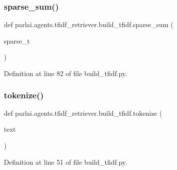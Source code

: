 \subsubsection{\texorpdfstring{sparse\+\_\+sum()}{sparse\_sum()}}
{\footnotesize\ttfamily def parlai.\+agents.\+tfidf\+\_\+retriever.\+build\+\_\+tfidf.\+sparse\+\_\+sum (\begin{DoxyParamCaption}\item[{}]{sparse\+\_\+t }\end{DoxyParamCaption})}



Definition at line 82 of file build\+\_\+tfidf.\+py.

\mbox{\label{namespaceparlai_1_1agents_1_1tfidf__retriever_1_1build__tfidf_a1fdb457e98eb4e4c26047e229686a616}} 
\subsubsection{\texorpdfstring{tokenize()}{tokenize()}}
{\footnotesize\ttfamily def parlai.\+agents.\+tfidf\+\_\+retriever.\+build\+\_\+tfidf.\+tokenize (\begin{DoxyParamCaption}\item[{}]{text }\end{DoxyParamCaption})}



Definition at line 51 of file build\+\_\+tfidf.\+py.



